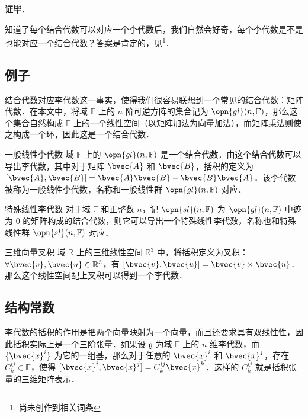 \textbf{证毕}．

知道了每个结合代数可以对应一个李代数后，我们自然会好奇，每个李代数是不是也能对应一个结合代数？答案是肯定的，见\footnote{尚未创作到相关词条}．


\subsection{例子}

结合代数对应李代数这一事实，使得我们很容易联想到一个常见的结合代数：矩阵代数．在本文中，将域 $\mathbb{F}$ 上的 $n$ 阶可逆方阵的集合记为 $\opn{gl}(n, \mathbb{F})$，那么这个集合自然构成 $\mathbb{F}$ 上的一个线性空间（以矩阵加法为向量加法），而矩阵乘法则使之构成一个环，因此这是一个结合代数．

\begin{example}{一般线性李代数}
域 $\mathbb{F}$ 上的 $\opn{gl}(n, \mathbb{F})$ 是一个结合代数．由这个结合代数可以导出李代数，其中对于矩阵 $\bvec{A}$ 和 $\bvec{B}$，括积的定义为 $[\bvec{A}, \bvec{B}]=\bvec{A}\bvec{B}-\bvec{B}\bvec{A}$．该李代数被称为一般线性李代数，名称和一般线性群 $\opn{gl}(n, \mathbb{F})$ 对应．
\end{example}

\begin{example}{特殊线性李代数}
对于域 $\mathbb{F}$ 和正整数 $n$，记 $\opn{sl}(n, \mathbb{F})$ 为 $\opn{gl}(n, \mathbb{F})$ 中迹为 $0$ 的矩阵构成的结合代数，则它可以导出一个特殊线性李代数，名称也和特殊线性群 $\opn{sl}(n, \mathbb{F})$ 对应．
\end{example}

\begin{example}{三维向量叉积}
域 $\mathbb{R}$ 上的三维线性空间 $\mathbb{R}^3$ 中，将括积定义为叉积：$\forall \bvec{v}, \bvec{u}\in \mathbb{R}^3$，有 $[\bvec{v}, \bvec{u}]=\bvec{v}\times\bvec{u}$．那么这个线性空间配上叉积可以得到一个李代数．
\end{example}

\subsection{结构常数}

李代数的括积的作用是把两个向量映射为一个向量，而且还要求具有双线性性，因此括积实际上是一个三阶张量．如果设 $\mathfrak{g}$ 为域 $\mathbb{F}$ 上的 $n$ 维李代数，而 $\{\bvec{x}^i\}$ 为它的一组基，那么对于任意的 $\bvec{x}^i$ 和 $\bvec{x}^j$，存在 $C_k^{ij}\in\mathbb{F}$，使得 $[\bvec{x}^i, \bvec{x}^j]=C_k^{ij}\bvec{x}^k$．这样的 $C_k^{ij}$ 就是括积张量的三维矩阵表示．

